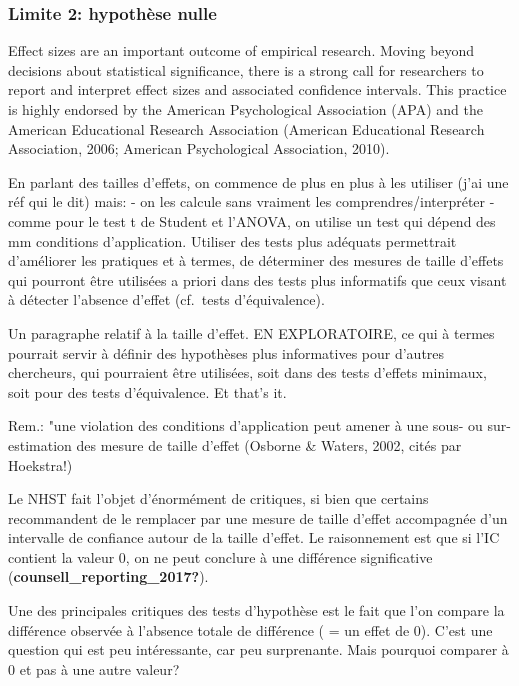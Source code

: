 \documentclass[
  english,
  man]{apa6}
\begin{document}
\hypertarget{limite-2-hypothuxe8se-nulle}{%
\subsubsection{Limite 2: hypothèse nulle}\label{limite-2-hypothuxe8se-nulle}}

Effect sizes are an important outcome of empirical research. Moving beyond decisions about statistical significance, there is a strong call for researchers to report and interpret effect sizes and associated confidence intervals. This practice is highly endorsed by the American Psychological Association (APA) and the American Educational Research Association (American Educational Research Association, 2006; American Psychological Association, 2010).

En parlant des tailles d'effets, on commence de plus en plus à les utiliser (j'ai une réf qui le dit) mais:
- on les calcule sans vraiment les comprendres/interpréter
- comme pour le test t de Student et l'ANOVA, on utilise un test qui dépend des mm conditions d'application.
Utiliser des tests plus adéquats permettrait d'améliorer les pratiques et à termes, de déterminer des mesures de taille d'effets qui pourront être utilisées a priori dans des tests plus informatifs que ceux visant à détecter l'absence d'effet (cf.~tests d'équivalence).

Un paragraphe relatif à la taille d'effet. EN EXPLORATOIRE, ce qui à termes pourrait servir à définir des hypothèses plus informatives pour d'autres chercheurs, qui pourraient être utilisées, soit dans des tests d'effets minimaux, soit pour des tests d'équivalence. Et that's it.

Rem.: "une violation des conditions d'application peut amener à une sous- ou sur-estimation des mesure de taille d'effet (Osborne \& Waters, 2002, cités par Hoekstra!)

Le NHST fait l'objet d'énormément de critiques, si bien que certains recommandent de le remplacer par une mesure de taille d'effet accompagnée d'un intervalle de confiance autour de la taille d'effet. Le raisonnement est que si l'IC contient la valeur 0, on ne peut conclure à une différence significative (\textbf{counsell\_reporting\_2017?}).

Une des principales critiques des tests d'hypothèse est le fait que l'on compare la différence observée à l'absence totale de différence ( = un effet de 0). C'est une question qui est peu intéressante, car peu surprenante. Mais pourquoi comparer à 0 et pas à une autre valeur?
\end{document}
